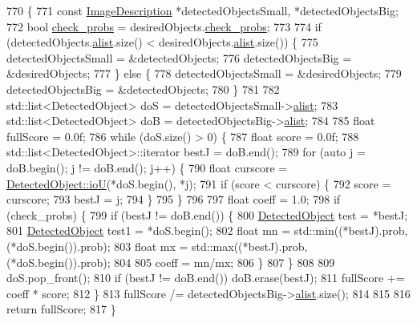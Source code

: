 \begin{DoxyCode}
770                                                                                                            
         \{
771         \textcolor{keyword}{const} \hyperlink{classImageDescription}{ImageDescription} *detectedObjectsSmall, *detectedObjectsBig;
772         \textcolor{keywordtype}{bool} \hyperlink{classImageDescription_a4df135809acd954ad6882c2b805b2a5b}{check\_probs} = desiredObjects.\hyperlink{classImageDescription_a4df135809acd954ad6882c2b805b2a5b}{check\_probs};
773 
774         \textcolor{keywordflow}{if} (detectedObjects.\hyperlink{classImageDescription_aa814580e2dd58fc3442ddd3549e6d81d}{alist}.size() < desiredObjects.\hyperlink{classImageDescription_aa814580e2dd58fc3442ddd3549e6d81d}{alist}.size()) \{
775             detectedObjectsSmall = &detectedObjects;
776             detectedObjectsBig = &desiredObjects;
777         \} \textcolor{keywordflow}{else} \{
778             detectedObjectsSmall = &desiredObjects;
779             detectedObjectsBig = &detectedObjects;
780         \}
781 
782         std::list<DetectedObject> doS = detectedObjectsSmall->\hyperlink{classImageDescription_aa814580e2dd58fc3442ddd3549e6d81d}{alist};
783         std::list<DetectedObject> doB = detectedObjectsBig->\hyperlink{classImageDescription_aa814580e2dd58fc3442ddd3549e6d81d}{alist};
784 
785         \textcolor{keywordtype}{float} fullScore = 0.0f;
786         \textcolor{keywordflow}{while} (doS.size() > 0) \{
787             \textcolor{keywordtype}{float} score = 0.0f;
788             std::list<DetectedObject>::iterator bestJ = doB.end();
789             \textcolor{keywordflow}{for} (\textcolor{keyword}{auto} j = doB.begin(); j != doB.end(); j++) \{
790                 \textcolor{keywordtype}{float} curscore = \hyperlink{classDetectedObject_abc68e001862990d52703deff97fe0db6}{DetectedObject::ioU}(*doS.begin(), *j);
791                 \textcolor{keywordflow}{if} (score < curscore) \{
792                     score = curscore;
793                     bestJ = j;
794                 \}
795             \}
796 
797             \textcolor{keywordtype}{float} coeff = 1.0;
798             \textcolor{keywordflow}{if} (check\_probs) \{
799                 \textcolor{keywordflow}{if} (bestJ != doB.end()) \{
800                     \hyperlink{classDetectedObject}{DetectedObject} test = *bestJ;
801                     \hyperlink{classDetectedObject}{DetectedObject} test1 = *doS.begin();
802                     \textcolor{keywordtype}{float} mn = std::min((*bestJ).prob, (*doS.begin()).prob);
803                     \textcolor{keywordtype}{float} mx = std::max((*bestJ).prob, (*doS.begin()).prob);
804 
805                     coeff = mn/mx;
806                 \}
807             \}
808 
809             doS.pop\_front();
810             \textcolor{keywordflow}{if} (bestJ != doB.end()) doB.erase(bestJ);
811             fullScore += coeff * score;
812         \}
813         fullScore /= detectedObjectsBig->\hyperlink{classImageDescription_aa814580e2dd58fc3442ddd3549e6d81d}{alist}.size();
814 
815 
816         \textcolor{keywordflow}{return} fullScore;
817     \}
\end{DoxyCode}
